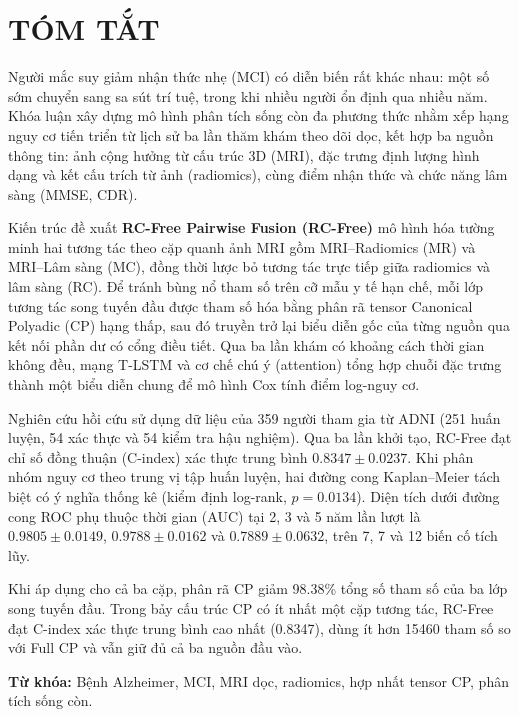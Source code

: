 \chapter*{TÓM TẮT}

Người mắc suy giảm nhận thức nhẹ (MCI) có diễn biến rất khác nhau: một số sớm chuyển sang sa sút trí tuệ, trong khi nhiều người ổn định qua nhiều năm. Khóa luận xây dựng mô hình phân tích sống còn đa phương thức nhằm xếp hạng nguy cơ tiến triển từ lịch sử ba lần thăm khám theo dõi dọc, kết hợp ba nguồn thông tin: ảnh cộng hưởng từ cấu trúc 3D (MRI), đặc trưng định lượng hình dạng và kết cấu trích từ ảnh (radiomics), cùng điểm nhận thức và chức năng lâm sàng (MMSE, CDR).

Kiến trúc đề xuất \textbf{RC-Free Pairwise Fusion (RC-Free)} mô hình hóa tường minh hai tương tác theo cặp quanh ảnh MRI gồm MRI--Radiomics (MR) và MRI--Lâm sàng (MC), đồng thời lược bỏ tương tác trực tiếp giữa radiomics và lâm sàng (RC). Để tránh bùng nổ tham số trên cỡ mẫu y tế hạn chế, mỗi lớp tương tác song tuyến đầu được tham số hóa bằng phân rã tensor Canonical Polyadic (CP) hạng thấp, sau đó truyền trở lại biểu diễn gốc của từng nguồn qua kết nối phần dư có cổng điều tiết. Qua ba lần khám có khoảng cách thời gian không đều, mạng T-LSTM và cơ chế chú ý (attention) tổng hợp chuỗi đặc trưng thành một biểu diễn chung để mô hình Cox tính điểm log-nguy cơ.

Nghiên cứu hồi cứu sử dụng dữ liệu của 359 người tham gia từ ADNI (251 huấn luyện, 54 xác thực và 54 kiểm tra hậu nghiệm). Qua ba lần khởi tạo, RC-Free đạt chỉ số đồng thuận (C-index) xác thực trung bình $0.8347\pm0.0237$. Khi phân nhóm nguy cơ theo trung vị tập huấn luyện, hai đường cong Kaplan--Meier tách biệt có ý nghĩa thống kê (kiểm định log-rank, $p=0.0134$). Diện tích dưới đường cong ROC phụ thuộc thời gian (AUC) tại 2, 3 và 5 năm lần lượt là $0.9805\pm0.0149$, $0.9788\pm0.0162$ và $0.7889\pm0.0632$, trên 7, 7 và 12 biến cố tích lũy.

Khi áp dụng cho cả ba cặp, phân rã CP giảm 98.38\% tổng số tham số của ba lớp song tuyến đầu. Trong bảy cấu trúc CP có ít nhất một cặp tương tác, RC-Free đạt C-index xác thực trung bình cao nhất (0.8347), dùng ít hơn 15460 tham số so với Full CP và vẫn giữ đủ cả ba nguồn đầu vào.

\noindent\textbf{Từ khóa:} Bệnh Alzheimer, MCI, MRI dọc, radiomics, hợp nhất tensor CP, phân tích sống còn.
